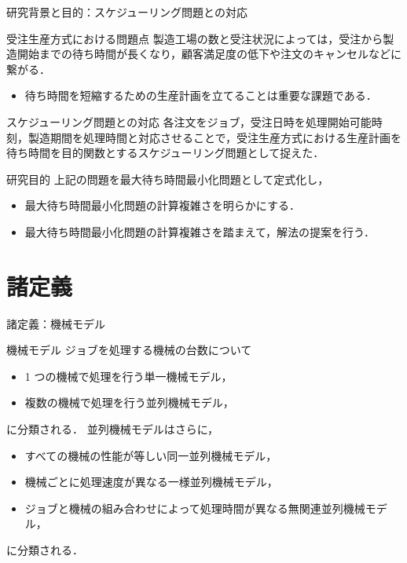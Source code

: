 \documentclass[dvipdfmx]{beamer}
\begin{document}
    \begin{frame}{研究背景と目的：スケジューリング問題との対応}
      \begin{block}{受注生産方式における問題点}
        製造工場の数と受注状況によっては，受注から製造開始までの\alert{待ち時間}が長くなり，顧客満足度の低下や注文のキャンセルなどに繋がる．
      \end{block}
      \begin{itemize}
        \setlength{\leftskip}{-5mm}
        \item 待ち時間を短縮するための生産計画を立てることは重要な課題である．
      \end{itemize}

      \begin{block}{スケジューリング問題との対応}
        各注文を\alert{ジョブ}，受注日時を\alert{処理開始可能時刻}，製造期間を\alert{処理時間}と対応させることで，受注生産方式における生産計画を\alert{待ち時間}を目的関数とするスケジューリング問題として捉えた．
      \end{block}

      \begin{block}{研究目的}
        上記の問題を\alert{最大待ち時間最小化問題}として定式化し，
        \begin{itemize}
          \setlength{\leftskip}{-2mm}
          \item 最大待ち時間最小化問題の計算複雑さを明らかにする．
          \item 最大待ち時間最小化問題の計算複雑さを踏まえて，解法の提案を行う．
        \end{itemize}
      \end{block}

    \end{frame}
    \section{諸定義}
    \begin{frame}{諸定義：機械モデル}
      \begin{block}{機械モデル}
        ジョブを処理する機械の台数について
        \begin{itemize}
          \item 1 つの機械で処理を行う\alert{単一機械モデル}，
          \item 複数の機械で処理を行う\alert{並列機械モデル}，
        \end{itemize}
        に分類される．
        並列機械モデルはさらに，
        \begin{itemize}
          \item すべての機械の性能が等しい\alert{同一並列機械モデル}，
          \item 機械ごとに処理速度が異なる\alert{一様並列機械モデル}，
          \item ジョブと機械の組み合わせによって処理時間が異なる\alert{無関連並列機械モデル}，
        \end{itemize}
        に分類される．
      \end{block}
    \end{frame}
\end{document}
